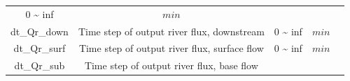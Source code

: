 \documentclass[]{scrbook}
\begin{document}
\begin{longtable}[]{@{}ccccc@{}}
\begin{minipage}[t]{0.10\columnwidth}
0 \textasciitilde{} inf\strut
\end{minipage} & \begin{minipage}[t]{0.10\columnwidth}\centering\strut
\(min\)\strut
\end{minipage} & \begin{minipage}[t]{0.26\columnwidth}\centering\strut
\strut
\end{minipage}\tabularnewline
\begin{minipage}[t]{0.17\columnwidth}\centering\strut
dt\_Qr\_down\strut
\end{minipage} & \begin{minipage}[t]{0.23\columnwidth}\centering\strut
Time step of output river flux, downstream\strut
\end{minipage} & \begin{minipage}[t]{0.10\columnwidth}\centering\strut
0 \textasciitilde{} inf\strut
\end{minipage} & \begin{minipage}[t]{0.10\columnwidth}\centering\strut
\(min\)\strut
\end{minipage} & \begin{minipage}[t]{0.26\columnwidth}\centering\strut
\strut
\end{minipage}\tabularnewline
\begin{minipage}[t]{0.17\columnwidth}\centering\strut
dt\_Qr\_surf\strut
\end{minipage} & \begin{minipage}[t]{0.23\columnwidth}\centering\strut
Time step of output river flux, surface flow\strut
\end{minipage} & \begin{minipage}[t]{0.10\columnwidth}\centering\strut
0 \textasciitilde{} inf\strut
\end{minipage} & \begin{minipage}[t]{0.10\columnwidth}\centering\strut
\(min\)\strut
\end{minipage} & \begin{minipage}[t]{0.26\columnwidth}\centering\strut
\strut
\end{minipage}\tabularnewline
\begin{minipage}[t]{0.17\columnwidth}\centering\strut
dt\_Qr\_sub\strut
\end{minipage} & \begin{minipage}[t]{0.23\columnwidth}\centering\strut
Time step of output river flux, base flow\strut
\end{minipage} & \begin{minipage}[t]{0.10\columnwidth}\centering\strut

\end{minipage}
\end{longtable}
\end{document}
